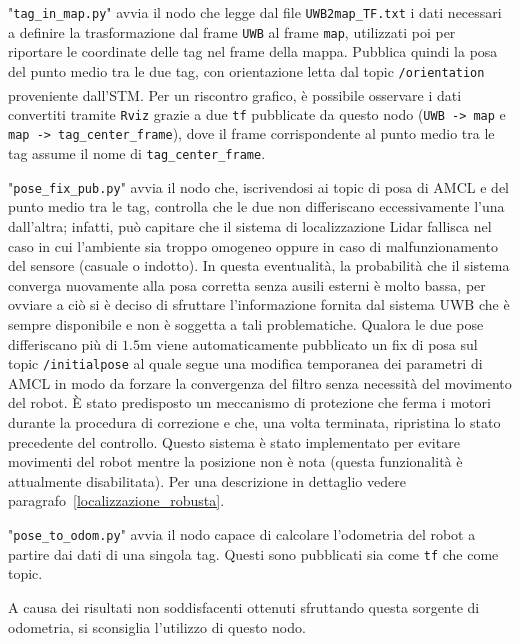 "\verb!tag_in_map.py!" avvia il nodo che legge dal file \verb!UWB2map_TF.txt! i dati necessari a definire la trasformazione dal frame \verb!UWB! al frame \verb!map!, utilizzati poi per riportare le coordinate delle tag nel frame della mappa. Pubblica quindi la posa del punto medio tra le due tag, con orientazione letta dal topic \verb!/orientation! proveniente dall'STM\textsuperscript\textregistered. Per un riscontro grafico, è possibile osservare i dati convertiti tramite \verb!Rviz! grazie a due \verb!tf! pubblicate da questo nodo (\verb!UWB -> map! e \verb!map -> tag_center_frame!), dove il frame corrispondente al punto medio tra le tag assume il nome di \verb!tag_center_frame!.

\bigskip

"\verb!pose_fix_pub.py!" avvia il nodo che, iscrivendosi ai topic di posa di AMCL e del punto medio tra le tag, controlla che le due non differiscano eccessivamente l'una dall'altra; infatti, può capitare che il sistema di localizzazione Lidar fallisca nel caso in cui l'ambiente sia troppo omogeneo oppure in caso di malfunzionamento del sensore (casuale o indotto). In questa eventualità, la probabilità che il sistema converga nuovamente alla posa corretta senza ausili esterni è molto bassa, per ovviare a ciò si è deciso di sfruttare l'informazione fornita dal sistema UWB che è sempre disponibile e non è soggetta a tali problematiche. Qualora le due pose differiscano più di $1.5$m viene automaticamente pubblicato un fix di posa sul topic \verb!/initialpose! al quale segue una modifica temporanea dei parametri di AMCL in modo da forzare la convergenza del filtro senza necessità del movimento del robot. È stato predisposto un meccanismo di protezione che ferma i motori durante la procedura di correzione e che, una volta terminata, ripristina lo stato precedente del controllo. Questo sistema è stato implementato per evitare movimenti del robot mentre la posizione non è nota (questa funzionalità è attualmente disabilitata). Per una descrizione in dettaglio vedere paragrafo~\ref{localizzazione_robusta}.

\bigskip

"\verb!pose_to_odom.py!" avvia il nodo capace di calcolare l'odometria del robot a partire dai dati di una singola tag. Questi sono pubblicati sia come \texttt{tf} che come topic. 

A causa dei risultati non soddisfacenti ottenuti sfruttando questa sorgente di odometria, si sconsiglia l'utilizzo di questo nodo.

\bigskip

